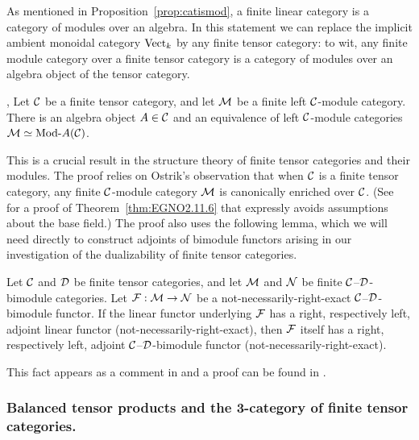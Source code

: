 \documentclass{amsart}
\begin{document}
As mentioned in Proposition~\ref{prop:catismod}, a finite linear category is a category of modules over an algebra.  In this statement we can replace the implicit ambient monoidal category $\mathrm{Vect}_k$ by any finite tensor category: to wit, any finite module category over a finite tensor category is a category of modules over an algebra object of the tensor category.

\begin{theorem}{\cite[Thm 2.11.6]{EGNO}, \cite[Thm 1]{MR1976459}} \label{thm:EGNO2.11.6}
Let $\mathcal C$ be a finite tensor category, and let $\mathcal M$ be a finite left $\mathcal C$-module category.  There is an algebra object $A \in \mathcal C$ and an equivalence of left $\mathcal C$-module categories $\cM \simeq \Mod{}{A}(\cC)$.
\end{theorem}

\nid This is a crucial result in the structure theory of finite tensor categories and their modules.  The proof relies on Ostrik's observation \cite{MR1976459, EO-ftc} that when $\mathcal C$ is a finite tensor category, any finite $\mathcal C$-module category $\mathcal M$ is canonically enriched over $\mathcal C$.  (See~\cite{BTP} for a proof of Theorem~\ref{thm:EGNO2.11.6} that expressly avoids assumptions about the base field.)  The proof also uses the following lemma, which we will need directly to construct adjoints of bimodule functors arising in our investigation of the dualizability of finite tensor categories.

\begin{lemma} \label{lma:module-adjoint}
Let $\mathcal C$ and $\mathcal D$ be finite tensor categories, and let $\mathcal M$ and $\mathcal N$ be finite $\mathcal C$--$\mathcal D$-bimodule categories.  Let $\mathcal F: \mathcal M \to \mathcal N$ be a not-necessarily-right-exact $\mathcal C$--$\mathcal D$-bimodule functor.  If the linear functor underlying $\mathcal F$ has a right, respectively left, adjoint linear functor (not-necessarily-right-exact), then $\mathcal F$ itself has a right, respectively left, adjoint $\mathcal C$--$\mathcal D$-bimodule functor (not-necessarily-right-exact).
\end{lemma}


\nid This fact appears as a comment in \cite{EO-ftc} and a proof can be found in \cite{BTP}.

\subsubsection{Balanced tensor products and the 3-category of finite tensor categories.}
\end{document}
